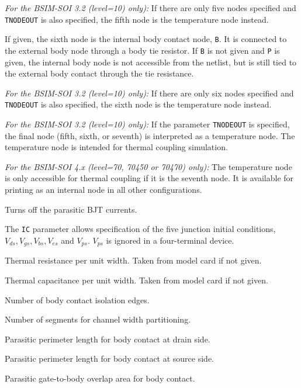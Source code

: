 \begin{Device}
\begin{Parameters}
{\em For the BSIM-SOI 3.2 (level=10) only):} If there are only five
nodes specified and \texttt{TNODEOUT} is also specified, the fifth
node is the temperature node instead.


If given, the sixth node is the internal body contact node, \texttt{B}.  It is
connected to the external body node through a body tie resistor.  If \texttt{B}
is not given and \texttt{P} is given, the internal body node is not accessible
from the netlist, but is still tied to the external body contact through the
tie resistance.

{\em For the BSIM-SOI 3.2 (level=10) only):} If there are only six
nodes specified and \texttt{TNODEOUT} is also specified, the sixth
node is the temperature node instead.


{\em For the BSIM-SOI 3.2 (level=10) only):} If the parameter \texttt{TNODEOUT} is specified, the final node (fifth, sixth,
or seventh) is interpreted as a temperature node.  The temperature node is
intended for thermal coupling simulation.

{\em For the BSIM-SOI 4.x (level=70, 70450 or 70470) only):} The temperature
node is only accessible for thermal coupling if it is the seventh
node.  It is available for printing as an internal node in all other
configurations.

Turns off the parasitic BJT currents.

The \texttt{IC} parameter allows specification of the five junction initial
conditions, $V_{ds}, V_{gs}, V_{bs}, V_{es}$ and $V_{ps}$.  $V_{ps}$ is ignored
in a four-terminal device.

Thermal resistance per unit width.  Taken from model card if not given.

Thermal capacitance per unit width.  Taken from model card if not given.

Number of body contact isolation edges.

Number of segments for channel width partitioning.

Parasitic perimeter length for body contact at drain side.

Parasitic perimeter length for body contact at source side.

Parasitic gate-to-body overlap area for body contact.


\end{Parameters}
\end{Device}
